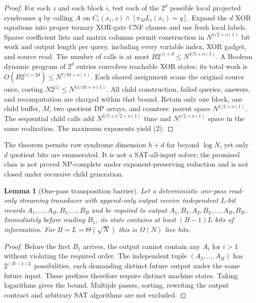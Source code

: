 \documentclass[11pt]{article}
\newtheorem{lemma}[theorem]{Lemma}
\begin{document}
\begin{proof}
For each $z$ and each block $i$, test each of the $2^d$
possible local projected syndromes $q$ by calling $A$ on
$C_i(x_i,z)\land[\pi_M L_i(x_i)=q]$.
Expand the $d$ XOR equations into proper ternary XOR-gate
CNF clauses and use fresh local labels.
Sparse coefficient lists and matrix columns permit construction
in $N^{1/2+o(1)}$ bit work and output length per query,
including every variable index, XOR gadget, and source read.
The number of calls is at most
$B2^{|z|+d}\le N^{3/5+o(1)}$.
A Boolean dynamic program of $2^d$ entries convolves
reachable XOR states; its total work is
$O(B2^{|z|+2d})\le N^{7/10+o(1)}$.
Each shared assignment scans the original source once, costing
$N2^{|z|}\le N^{11/10+o(1)}$.
All child construction, failed queries, answers, and recomputation
are charged within that bound. Retain only one block, one
child buffer, $M$, two quotient DP arrays, and counters:
parent space $N^{1/2+o(1)}$.
The sequential child calls add $N^{3/5+t/2+o(1)}$
time and $N^{s/2+o(1)}$ space in the same realization.
The maximum exponents yield (2).
\end{proof}
The theorem permits raw syndrome dimension $h+d$ far beyond
$\log N$, yet only $d$ quotient bits are enumerated.
It is not a SAT-all-input solver; the promised class is
not proved NP-complete under exponent-preserving reduction
and is not closed under recursive child generation.
\begin{lemma}[One-pass transposition barrier]
Let a deterministic one-pass read-only streaming transducer
with append-only output receive independent $L$-bit records
$A_1,\ldots,A_B,B_1,\ldots,B_B$ and be required to output
$A_1,B_1,A_2,B_2,\ldots,A_B,B_B$.
Immediately before reading $B_1$, its state contains at least
$(B-1)L$ bits of information. For $B=L=\Theta(\sqrt N)$
this is $\Omega(N)$ live bits.
\end{lemma}
\begin{proof}
Before the first $B_1$ arrives, the output cannot contain
any $A_i$ for $i>1$ without violating the required order.
The independent tuple $(A_2,\ldots,A_B)$ has
$2^{(B-1)L}$ possibilities, each demanding distinct future
output under the same future input. These prefixes therefore
require distinct machine states. Taking logarithms gives
the bound. Multiple passes, sorting, rewriting the output
contract and arbitrary SAT algorithms are not excluded.
\end{proof}
\end{document}
